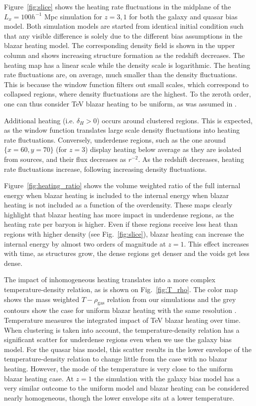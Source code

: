 \documentclass[numberedappendix]{emulateapj}
\begin{document}
Figure~\ref{fig:slice} shows the heating rate fluctuations in the midplane of the $L_x=100h^{-1}$ Mpc simulation for $z=3,1$ for both the galaxy and quasar bias model. Both simulation models are started from identical initial condition such that any visible difference is solely due to the different bias assumptions in the blazar heating model. The corresponding density field is shown in the upper column and shows increasing structure formation as the redshift decreases. The heating map has a linear scale while the density scale is logarithmic. The heating rate fluctuations are, on average, much smaller than the density fluctuations. This is because the window function filters out small scales, which correspond to collapsed regions, where density fluctuations are the highest. To the zeroth order, one can thus consider TeV blazar heating to be uniform, as was assumed in \citet{2012ApJ...752...23C}.

Additional heating (i.e. $\delta_H>0$) occurs around clustered regions. This is expected, as the window function translates large scale density fluctuations into heating rate fluctuations. Conversely, underdense regions, such as the one around $\{x=60,y=70\}$ (for $z=3$) display heating below average as they are isolated from sources, and their flux decreases as $r^{-2}$. As the redshift decreases, heating rate fluctuations increase, following increasing density fluctuations.

Figure~\ref{fig:heating_ratio} shows the volume weighted ratio of the full internal energy when blazar heating is included to the internal energy when blazar heating is not included as a function of the overdensity. These maps clearly highlight that blazar heating has more impact in underdense regions, as the heating rate per baryon is higher. Even if these regions receive less heat than regions with higher density (see Fig.~\ref{fig:slice}),  blazar heating can increase the internal energy by almost two orders of magnitude at $z=1$. This effect increases with time, as structures grow, the dense regions get denser and the voids get less dense. 

The impact of inhomogeneous heating translates into a more complex temperature-density relation, as is shown on Fig.~\ref{fig:T_rho}. The color map shows the mass weighted $T-\rho_{\mathrm{gas}}$ relation from our simulations and the grey contours show the case for uniform blazar heating with the same resolution \citep{2012MNRAS.423..149P}. Temperature measures the integrated impact of TeV blazar heating over time. When clustering is taken into account, the temperature-density relation has a significant scatter for underdense regions even when we use the galaxy bias model. For the quasar bias model, this scatter results in the lower envelope of the temperature-density relation to change little from the case with no blazar heating. However, the mode of the temperature is very close to the uniform blazar heating case. At $z=1$ the simulation with the galaxy bias model has a very similar outcome to the uniform model and blazar heating can be considered nearly homogeneous, though the lower envelope sits at a lower temperature.
\end{document}
